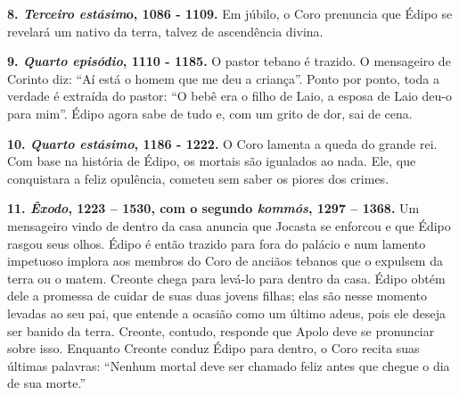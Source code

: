 \textbf{8. \emph{Terceiro estásim}o, 1086 - 1109.} Em júbilo, o Coro
prenuncia que Édipo se revelará um nativo da terra, talvez de
ascendência divina.

\textbf{9. \emph{Quarto episódio}, 1110 - 1185.} O pastor tebano é
trazido. O mensageiro de Corinto diz: ``Aí está o homem que me deu a
criança''. Ponto por ponto, toda a verdade é extraída do pastor: ``O
bebê era o filho de Laio, a esposa de Laio deu-o para mim''. Édipo agora
sabe de tudo e, com um grito de dor, sai de cena.

\textbf{10. \emph{Quarto estásimo}, 1186 - 1222.} O Coro lamenta a queda
do grande rei. Com base na história de Édipo, os mortais são igualados
ao nada. Ele, que conquistara a feliz opulência, cometeu sem saber os
piores dos crimes.

\textbf{11. \emph{Êxodo}, 1223 -- 1530, com o segundo \emph{kommós},
1297 -- 1368.} Um mensageiro vindo de dentro da casa anuncia que Jocasta
se enforcou e que Édipo rasgou seus olhos. Édipo é então trazido para
fora do palácio e num lamento impetuoso implora aos membros do Coro de
anciãos tebanos que o expulsem da terra ou o matem. Creonte chega para
levá-lo para dentro da casa. Édipo obtém dele a promessa de cuidar de
suas duas jovens filhas; elas são nesse momento levadas ao seu pai, que
entende a ocasião como um último adeus, pois ele deseja ser banido da
terra. Creonte, contudo, responde que Apolo deve se pronunciar sobre
isso. Enquanto Creonte conduz Édipo para dentro, o Coro recita suas
últimas palavras: ``Nenhum mortal deve ser chamado feliz antes que
chegue o dia de sua morte.''